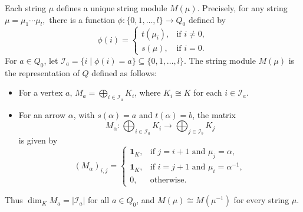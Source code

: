 \documentclass[a4paper,10pt]{amsart}
\theoremstyle{plain}          %
\theoremstyle{definition}
\newcommand{\id}{\mathbf{1}}
\newcommand{\Aut}{\mathrm{Aut}}
\begin{document}


 Each string $\mu$ defines a unique string module $M(\mu)$. 
Precisely, for any string $\mu=\mu_{1}\cdots \mu_{l},$ there is a function $\phi:\{0,1,\dots,l\}\to Q_0$ defined by
		\begin{equation}
			\phi(i)=\begin{cases}
				t(\mu_{i}),&\text{if } i\neq 0,\\
				s(\mu)      ,&\text{if } i=0.
			\end{cases}
		\end{equation}
		For $a\in Q_0$, let $\mathcal{I}_a=\{i\mid \phi(i)=a\}\subseteq\{0,1,\dots,l\}$. The string module $M(\mu)$ is the representation of $Q$ defined as follows:
		\begin{itemize}
			\item [$\bullet$]  For a vertex $a$,  $M_a=\bigoplus
   _{i\in \mathcal{I}_a} K_i$, where $K_i\cong K$ for each $i\in \mathcal{I}_a$.
			\item [$\bullet$]  For an arrow $\alpha$, with $s(\alpha)=a$ and $t(\alpha)=b$, the matrix $$M_\alpha:\bigoplus_{i\in \mathcal{I}_a}K_i\to\bigoplus_{j\in \mathcal{I}_b} K_j$$ is given by
   \begin{equation}
				(M_{\alpha})_{i,j}=\begin{cases}
					\id_K,&\text{if } j=i+1\text{ and } \mu_j=\alpha,\\
					\id_K,&\text{if } i=j+1\text{ and } \mu_i=\alpha^{-1},\\
					0,&\text{otherwise.}
				\end{cases}
    \end{equation}
		\end{itemize}
Thus $\dim_K M_a=|\mathcal{I}_a|$ for all $a\in Q_0$, and $M(\mu)\cong M(\mu^{-1})$ for every string $\mu$.
\end{document}

